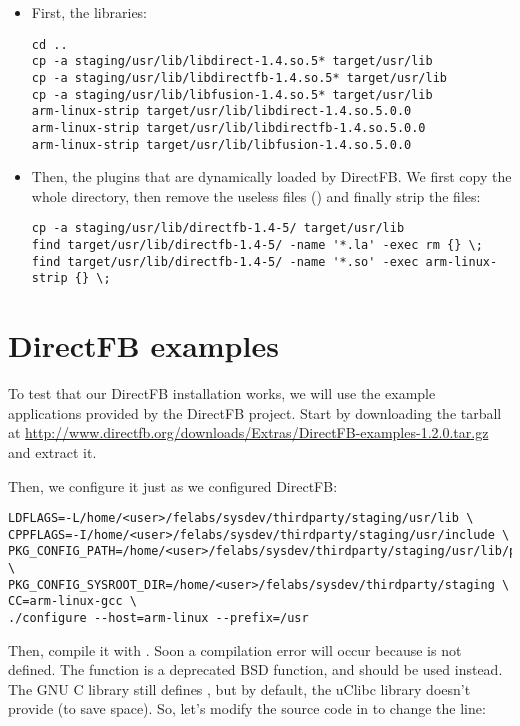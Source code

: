 \begin{itemize}

\item First, the libraries:
\small
\begin{verbatim}
cd ..
cp -a staging/usr/lib/libdirect-1.4.so.5* target/usr/lib
cp -a staging/usr/lib/libdirectfb-1.4.so.5* target/usr/lib
cp -a staging/usr/lib/libfusion-1.4.so.5* target/usr/lib
arm-linux-strip target/usr/lib/libdirect-1.4.so.5.0.0
arm-linux-strip target/usr/lib/libdirectfb-1.4.so.5.0.0
arm-linux-strip target/usr/lib/libfusion-1.4.so.5.0.0
\end{verbatim}
\normalsize

\item Then, the plugins that are dynamically loaded by DirectFB. We
  first copy the whole  directory, then
  remove the useless files () and finally strip the
   files:

\small
\begin{verbatim}
cp -a staging/usr/lib/directfb-1.4-5/ target/usr/lib
find target/usr/lib/directfb-1.4-5/ -name '*.la' -exec rm {} \;
find target/usr/lib/directfb-1.4-5/ -name '*.so' -exec arm-linux-strip {} \;
\end{verbatim}
\normalsize

\end{itemize}

\section{DirectFB examples}

To test that our DirectFB installation works, we will use the example
applications provided by the DirectFB project. Start by downloading
the tarball at
\url{http://www.directfb.org/downloads/Extras/DirectFB-examples-1.2.0.tar.gz}
and extract it.

Then, we configure it just as we configured DirectFB:

\small
\begin{verbatim}
LDFLAGS=-L/home/<user>/felabs/sysdev/thirdparty/staging/usr/lib \
CPPFLAGS=-I/home/<user>/felabs/sysdev/thirdparty/staging/usr/include \
PKG_CONFIG_PATH=/home/<user>/felabs/sysdev/thirdparty/staging/usr/lib/pkgconfig \
PKG_CONFIG_SYSROOT_DIR=/home/<user>/felabs/sysdev/thirdparty/staging \
CC=arm-linux-gcc \
./configure --host=arm-linux --prefix=/usr
\end{verbatim}
\normalsize

Then, compile it with . Soon a compilation error will occur
because  is not defined. The \code{bzero} function is a deprecated
BSD function, and  should be used instead. The GNU C library
still defines , but by default, the uClibc library doesn't
provide  (to save space). So, let's modify the source code in
\code{src/df_knuckles/matrix.c} to change the line:

